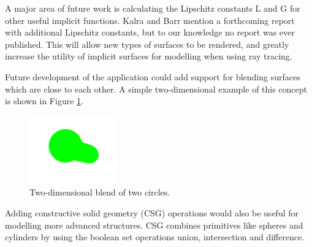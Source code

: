 \documentclass[conference]{acmsiggraph}
\begin{document}
A major area of future work is calculating the Lipschitz constants L and G
for other useful implicit functions.  Kalra and Barr \cite{KalraBarr1989} 
mention a forthcoming report with additional Lipschitz constants, but to
our knowledge no report was ever published.  This will allow new types of
surfaces to be rendered, and greatly increase the utility of implicit 
surfaces for modelling when using ray tracing.

Future development of the application could add support for blending surfaces
which are close to each other.  A simple two-dimensional example of this concept
is shown in Figure \ref{fig:blend2d}.

\begin{figure}[ht]
  \centering
  \includegraphics[width=1.5in]{figures/blend2d.png}
  \caption{Two-dimensional blend of two circles.}
  \label{fig:blend2d}
\end{figure}

Adding constructive solid geometry (CSG) operations would also be useful
for modelling more advanced structures.  CSG combines primitives like 
spheres and cylinders by using the boolean set operations union,
intersection and difference.



\end{document}
